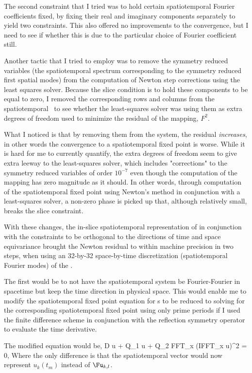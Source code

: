 The second constraint that I tried was to hold certain spatiotemporal Fourier coefficients fixed, by fixing their
real and imaginary components separately to yield two constraints. This also offered no improvements to the convergence,
but I need to see if whether this is due to the particular choice of Fourier coefficient still.

Another tactic that I tried to employ was to remove the symmetry reduced variables (the spatiotemporal spectrum
corresponding to the symmetry reduced first spatial modes) from the computation of Newton step corrections
using the least squares solver. Because the slice condition is to hold these components to be equal to zero,
I removed the corresponding rows and columns from the spatiotemporal \jacobianM\ to see whether the least-squares
solver was using them as extra degrees of freedom used to minimize the residual of the mapping, $F^{2}$.

What I noticed is that by removing them from the system, the residual \emph{increases}, in other words the convergence
to a spatiotemporal fixed point is worse. While it is hard for me to currently quantify, the extra degrees of freedom
seem to give extra leeway to the least-squares solver, which includes "corrections" to the symmetry reduced variables
of order $10^{-7}$ even though the computation of the mapping has zero magnitude as it should. In other words,
through computation of the spatiotemporal fixed point using Newton's method in conjunction with a least-squares solver,
a non-zero phase is picked up that, although relatively small, breaks the slice constraint.

With these changes, the in-slice spatiotemporal representation of  in
conjunction with the constraints to be orthogonal to the directions of time and space
equivariance brought the Newton residual to within machine precision in two steps,
when using an 32-by-32 space-by-time discretization (spatiotemporal Fourier modes)
of the \rpo.

The first would be to not have the spatiotemporal system be Fourier-Fourier
in spacetime but keep the time direction in physical space. This would enable
me to modify the spatiotemporal fixed point equation for {\ppo}s to be reduced
to solving for the corresponding spatiotemporal fixed point using only
prime periods if I used the finite difference scheme in conjunction with the
reflection symmetry operator to evaluate the time derivative.

The modified equation would be,
\beq
D \cdot u + Q_1 \cdot u + Q_2 \cdot FFT_x \cdot (IFFT_x \cdot u)^2 = 0,
\eeq
Where the only difference is that the spatiotemporal vector would now
represent $u_k(t_m)$ instead of $\Fu_{k,l}$.

